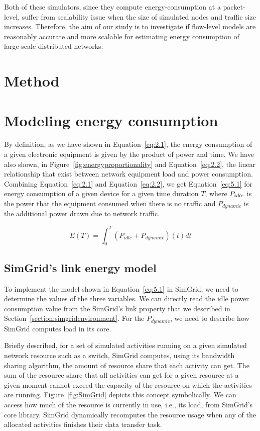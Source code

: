 Both of these simulators, since they compute energy-consumption at a packet-level, suffer from scalability issue when the size of simulated nodes and traffic size increases. Therefore, the aim of our study is to investigate if flow-level models are reasonably accurate and more scalable for estimating energy consumption of large-scale distributed networks.
\section{Method}

\section{Modeling energy consumption}
By definition, as we have shown in Equation~\ref{eq:2.1}, the energy consumption of a given electronic equipment is given by the product of power and time. We have also shown, in Figure~\ref{fig:energyproportionality} and Equation~\ref{eq:2.2}, the linear relationship that exist between network equipment load and power consumption. Combining Equation~\ref{eq:2.1} and Equation~\ref{eq:2.2}, we get Equation~\ref{eq:5.1} for energy consumption of a given device for a given time duration $T$, where \($$P_{idle}$$\) is the power that the equipment consumed when there is no traffic and \(P_{dynamic}\) is the additional power drawn due to network traffic.

\begin{equation} \label{eq:5.1}
E(T) =  \int_{0}^{T} (P_{idle} + P_{dynamic})(t) dt 
\end{equation} 


\subsection{SimGrid's link energy model}
To implement the model shown in Equation~\ref{eq:5.1} in SimGrid, we need to determine the values of the three variables. We can directly read the idle power consumption value from the SimGrid's link property that we described in Section~\ref{section:simgridenvironment}. For the \(P_{dynamic}\), we need to describe how SimGrid computes load in its core. 

Briefly described, for a set of simulated activities running on a given simulated network resource such as a switch, SimGrid computes, using its bandwidth sharing algorithm, the amount of resource share that each activity can get. The sum of the resource share that all activities can get for a given resource at a given moment cannot exceed the capacity of the resource on which the activities are running. Figure~\ref{fig:SimGrid} depicts this concept symbolically. We can access how much of the resource is currently in use, i.e., its load, from SimGrid's core library. SimGrid dynamically recomputes the resource usage when any of the allocated activities finishes their data transfer task. 

